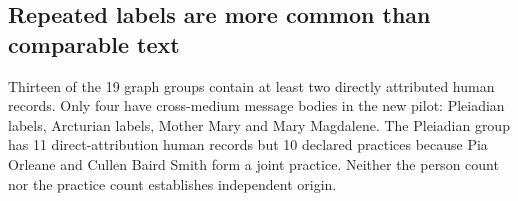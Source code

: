 \documentclass[
  11pt,
]{article}
\begin{document}
\FloatBarrier

\subsection{Repeated labels are more common than comparable
text}\label{repeated-labels-are-more-common-than-comparable-text}

Thirteen of the 19 graph groups contain at least two directly attributed
human records. Only four have cross-medium message bodies in the new
pilot: Pleiadian labels, Arcturian labels, Mother Mary and Mary
Magdalene. The Pleiadian group has 11 direct-attribution human records
but 10 declared practices because Pia Orleane and Cullen Baird Smith
form a joint practice. Neither the person count nor the practice count
establishes independent origin.
\end{document}
